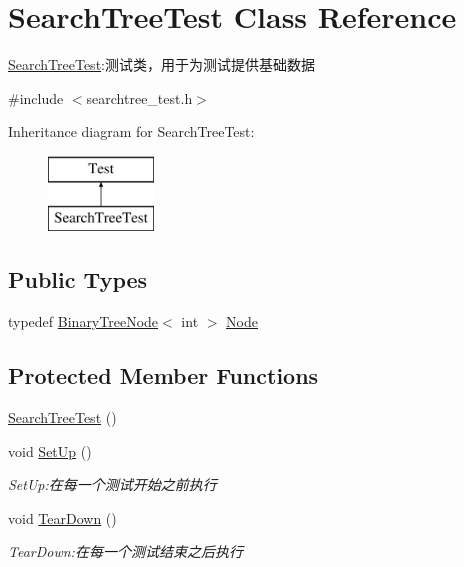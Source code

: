 \hypertarget{class_search_tree_test}{}\section{Search\+Tree\+Test Class Reference}
\label{class_search_tree_test}


\hyperlink{class_search_tree_test}{Search\+Tree\+Test}\+:测试类，用于为测试提供基础数据  




{\ttfamily \#include $<$searchtree\+\_\+test.\+h$>$}

Inheritance diagram for Search\+Tree\+Test\+:\begin{figure}[H]
\begin{center}
\leavevmode
\includegraphics[height=2.000000cm]{class_search_tree_test}
\end{center}
\end{figure}
\subsection*{Public Types}
\begin{DoxyCompactItemize}
\item 
typedef \hyperlink{struct_introdunction_to_algorithm_1_1_tree_algorithm_1_1_binary_tree_node}{Binary\+Tree\+Node}$<$ int $>$ \hyperlink{class_search_tree_test_a921d5813f947eb9b70417b69722bc050}{Node}
\end{DoxyCompactItemize}
\subsection*{Protected Member Functions}
\begin{DoxyCompactItemize}
\item 
\hyperlink{class_search_tree_test_a8499bee6e18b14298bb210e067d04e99}{Search\+Tree\+Test} ()
\item 
void \hyperlink{class_search_tree_test_a90a211d1322c06e96bee25849525c77f}{Set\+Up} ()
\begin{DoxyCompactList}\small\item\em Set\+Up\+:在每一个测试开始之前执行 \end{DoxyCompactList}\item 
void \hyperlink{class_search_tree_test_a2fff7db7a798909e087a66ce890f4f49}{Tear\+Down} ()
\begin{DoxyCompactList}\small\item\em Tear\+Down\+:在每一个测试结束之后执行 \end{DoxyCompactList}\end{DoxyCompactItemize}
